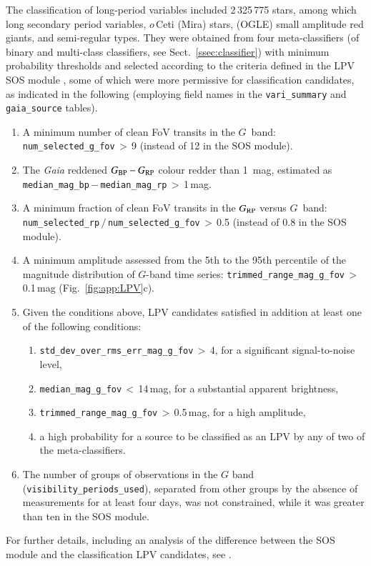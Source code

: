 \documentclass[longauth]{aa}
\def\gaia{\textit{Gaia}\xspace}
\def\g{$G$\xspace}
\def\rp{$G_{\rm RP}$\xspace}
\def\bprp{\mbox{$G_{\rm BP}-G_{\rm RP}$}\xspace}
\begin{document}
The classification of long-period variables included 2\,325\,775 stars, among which long secondary period variables, $o$\,Ceti (Mira) stars, (OGLE) small amplitude red giants, and semi-regular types.
They were obtained from four meta-classifiers (of binary and multi-class classifiers, see Sect.~\ref{ssec:classifier}) with minimum probability thresholds and selected according to the criteria defined in the LPV SOS module \citep{DR3-DPACP-171}, some of which were more permissive for classification candidates, as indicated in the following (employing field names in the \texttt{vari\_summary} and \texttt{gaia\_source} tables).
\begin{enumerate}
    \item A minimum number of clean FoV transits in the \g~band: \texttt{num\_selected\_g\_fov}\,$>$\,9 (instead of 12 in the SOS module).
    \item The \gaia reddened \bprp colour redder than 1~mag, estimated as  \texttt{median\_mag\_bp}\,$-$\,\texttt{median\_mag\_rp}\,$>$\,1\,mag.
    \item A minimum fraction of clean FoV transits in the \rp versus \g~band:   \texttt{num\_selected\_rp}\,$/$\,\texttt{num\_selected\_g\_fov}\,$>$\,0.5 (instead of 0.8 in the SOS module).
    \item A minimum amplitude assessed from the 5th to the 95th percentile of the magnitude distribution of \g-band time series: \texttt{trimmed\_range\_mag\_g\_fov}\,$>$\,0.1\,mag (Fig.~\ref{fig:app:LPV}c).
    \item Given the conditions above, LPV candidates satisfied in addition at least one of the following conditions: 
    \begin{enumerate}
       \item \texttt{std\_dev\_over\_rms\_err\_mag\_g\_fov}\,$>$\,4, for a significant signal-to-noise level,
       \item \texttt{median\_mag\_g\_fov}\,$<$\,14\,mag, for a substantial apparent brightness,
       \item \texttt{trimmed\_range\_mag\_g\_fov}\,$>$\,0.5\,mag, for a high amplitude,
       \item a high probability for a source to be classified as an LPV by any of two of the meta-classifiers.
    \end{enumerate}
    \item The number of groups of observations in the \g band (\texttt{visibility\_periods\_used}), separated from other groups by the absence of measurements for at least four days, was not constrained, while it was greater than ten in the SOS module. 
\end{enumerate}
For further details, including an analysis of the difference between the SOS module and the classification LPV candidates, see \citet{DR3-DPACP-171}.
\end{document}
